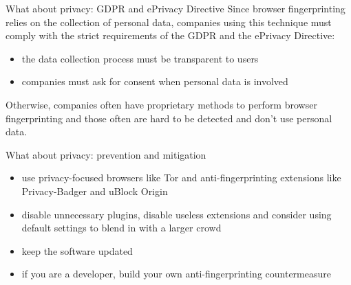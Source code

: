 \begin{frame}{What about privacy: GDPR and ePrivacy Directive}
  Since browser fingerprinting relies on the collection of personal data, companies using this technique must comply with the strict requirements of the GDPR and the ePrivacy Directive:
  \begin{itemize}
    \item the data collection process must be transparent to users
    \item companies must ask for consent when personal data is involved
  \end{itemize}
  Otherwise, companies often have proprietary methods to perform browser fingerprinting and those often are hard to be detected and don't use personal data.
\end{frame}

\begin{frame}{What about privacy: prevention and mitigation}
  \begin{itemize}
    \item use privacy-focused browsers like Tor and anti-fingerprinting extensions like Privacy-Badger and uBlock Origin
    \item disable unnecessary plugins, disable useless extensions and consider using default settings to blend in with a larger crowd
    \item keep the software updated
    \item if you are a developer, build your own anti-fingerprinting countermeasure
  \end{itemize}
\end{frame}